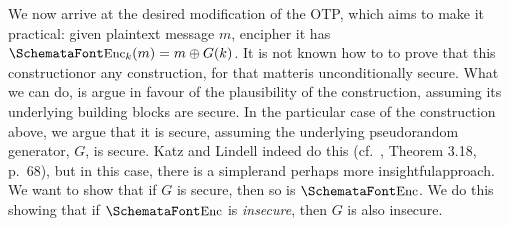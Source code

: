   We now arrive at the desired modification of the OTP, which aims to make it practical: given plaintext message $m$, encipher it has $\myemph{Enc}_k (m) = m \oplus G(k)$. It is not known how to to prove that this construction\emd or any construction, for that matter\emd is unconditionally secure. What we can do, is argue in favour of the plausibility of the construction, assuming its underlying building blocks are secure. In the particular case of the construction above, we argue that it is secure, assuming the underlying pseudorandom generator, $G$, is secure. Katz and Lindell indeed do this (cf.~\cite{KatzLindell:IMC}, Theorem 3.18, p.\ 68), but in this case, there is a simpler\emd and perhaps more insightful\emd approach. We want to show that if $G$ is secure, then so is $\myemph{Enc}$. We do this showing that if $\myemph{Enc}$ is \emph{insecure}, then $G$ is also insecure.

